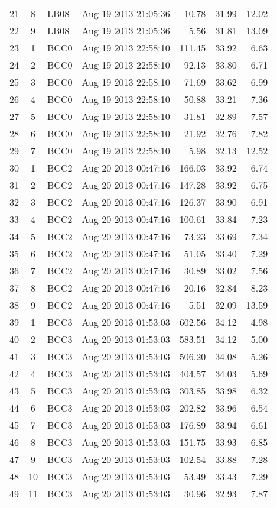\documentclass{article}
\begin{document}
\begin{longtable}{ccllrrr}
21&8&LB08&Aug 19 2013 21:05:36&10.78&31.99&12.02\\
22&9&LB08&Aug 19 2013 21:05:36&5.56&31.81&13.09\\
\hline 
23&1&BCC0&Aug 19 2013 22:58:10&111.45&33.92&6.63\\
24&2&BCC0&Aug 19 2013 22:58:10&92.13&33.80&6.71\\
25&3&BCC0&Aug 19 2013 22:58:10&71.69&33.62&6.99\\
26&4&BCC0&Aug 19 2013 22:58:10&50.88&33.21&7.36\\
27&5&BCC0&Aug 19 2013 22:58:10&31.81&32.89&7.57\\
28&6&BCC0&Aug 19 2013 22:58:10&21.92&32.76&7.82\\
29&7&BCC0&Aug 19 2013 22:58:10&5.98&32.13&12.52\\
\hline 
30&1&BCC2&Aug 20 2013 00:47:16&166.03&33.92&6.74\\
31&2&BCC2&Aug 20 2013 00:47:16&147.28&33.92&6.75\\
32&3&BCC2&Aug 20 2013 00:47:16&126.37&33.90&6.91\\
33&4&BCC2&Aug 20 2013 00:47:16&100.61&33.84&7.23\\
34&5&BCC2&Aug 20 2013 00:47:16&73.23&33.69&7.34\\
35&6&BCC2&Aug 20 2013 00:47:16&51.05&33.40&7.29\\
36&7&BCC2&Aug 20 2013 00:47:16&30.89&33.02&7.56\\
37&8&BCC2&Aug 20 2013 00:47:16&20.16&32.84&8.23\\
38&9&BCC2&Aug 20 2013 00:47:16&5.51&32.09&13.59\\
\hline 
39&1&BCC3&Aug 20 2013 01:53:03&602.56&34.12&4.98\\
40&2&BCC3&Aug 20 2013 01:53:03&583.51&34.12&5.00\\
41&3&BCC3&Aug 20 2013 01:53:03&506.20&34.08&5.26\\
42&4&BCC3&Aug 20 2013 01:53:03&404.57&34.03&5.69\\
43&5&BCC3&Aug 20 2013 01:53:03&303.85&33.98&6.32\\
44&6&BCC3&Aug 20 2013 01:53:03&202.82&33.96&6.54\\
45&7&BCC3&Aug 20 2013 01:53:03&176.89&33.94&6.61\\
46&8&BCC3&Aug 20 2013 01:53:03&151.75&33.93&6.85\\
47&9&BCC3&Aug 20 2013 01:53:03&102.54&33.88&7.28\\
48&10&BCC3&Aug 20 2013 01:53:03&53.49&33.43&7.29\\
49&11&BCC3&Aug 20 2013 01:53:03&30.96&32.93&7.87\\

\end{longtable}
\end{document}

